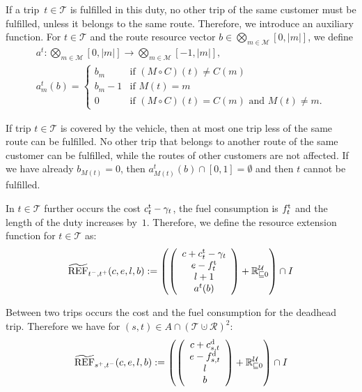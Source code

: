 If a trip~$t\in\mathcal{T}$ is fulfilled in this duty, no other trip of the same customer must be fulfilled, unless it belongs to the same route. Therefore, we introduce an auxiliary function. For ${t\in\mathcal{T}}$ and  the route resource vector ${b\in\bigotimes_{m\in\mathcal{M}}\left[0,|m|\right]}$, we define
\begin{gather*}
	a^t:\bigotimes_{m\in\mathcal{M}}\left[0,|m|\right] \to \bigotimes_{m\in\mathcal{M}}\left[-1,|m|\right], \\
	a^t_m(b) = \left\{ \begin{array}{cl} b_m & \text{if } \left(M\circ C\right)(t)\neq C(m) \\ b_m - 1 & \text{if } M(t)=m \\ 0 & \text{if } \left(M\circ C\right)(t)=C(m) \text{ and } M(t)\neq m. \end{array} \right.
\end{gather*}

If trip ${t\in\mathcal{T}}$ is covered by the vehicle, then at most one trip less of the same route can be fulfilled. No other trip that belongs to another route of the same customer can be fulfilled, while the routes of other customers are not affected. If we have already ${b_{M(t)}=0}$, then ${a^t_{M(t)}(b)\cap [0,1] = \emptyset}$ and then $t$ cannot be fulfilled.

In ${t\in\mathcal{T}}$ further occurs the cost ${c^{\operatorname{t}}_t-\gamma_t}$, the fuel consumption is $f^{\operatorname{t}}_t$ and the length of the duty increases by~$1$. Therefore, we define the resource extension function for $t\in\mathcal{T}$ as:
\begin{align}
	\widetilde{\operatorname{REF}}_{t^-,t^+}(c,e,l,b) := \left(\left(
	\begin{array}{c}
		c+c^{\operatorname{t}}_t-\gamma_t \\ e-f^{\operatorname{t}}_t \\ l+1 \\ a^t(b)
	\end{array}
	\right) + \mathbb{R}^{\mathcal{U}}_{\sqsubseteq 0}\right) \cap I \label{eq:ref_trip}
\end{align}

Between two trips occurs the cost and the fuel consumption for the deadhead trip. Therefore we have for ${(s,t)\in A\cap\left(\mathcal{T}\cupdot\mathcal{R}\right)^2}$:
\begin{align*}
	\widetilde{\operatorname{REF}}_{s^+,t^-}(c,e,l,b) := \left(\left(
	\begin{array}{c}
		c + c^{\operatorname{d}}_{s,t} \\ e-f^{\operatorname{d}}_{s,t} \\ l \\ b
	\end{array}
	\right) + \mathbb{R}^{\mathcal{U}}_{\sqsubseteq 0}\right) \cap I
\end{align*}

